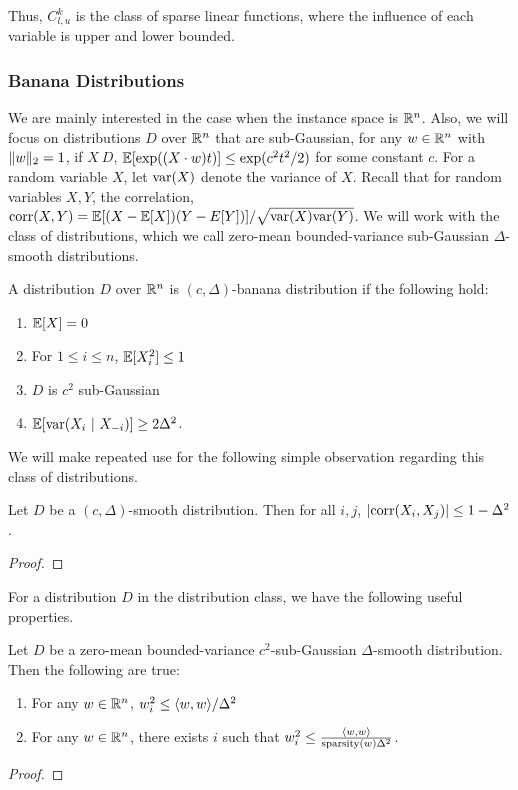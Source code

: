 Thus, $C^k_{l, u}$ is the class of sparse linear functions, where the influence
of each variable is upper and lower bounded.

\subsubsection{Banana Distributions}

We are mainly interested in the case when the instance space is $\mathbb{R}^n$.
Also, we will focus on distributions $D$ over $\mathbb{R}^n$ that are sub-Gaussian,
\ie for any $w \in \mathbb{R}^n$ with ${\Vert w \Vert_{2}} = 1$, if $X ~ D$, $\mathbb{E}[\exp((X
\cdot w) t)] \leq \exp(c^2t^2/2)$ for some constant $c$.  For a random variable
$X$, let $\mathrm{var}(X)$ denote the variance of $X$. Recall that for random variables
$X, Y$, the correlation, $\mathrm{corr}(X, Y) = \mathbb{E}[(X - \mathbb{E}[X]) (Y - E[Y])]/\sqrt{\mathrm{var}(X)
\mathrm{var}(Y)}$. We will work with the class of distributions, which we call zero-mean
bounded-variance sub-Gaussian $\Delta$-smooth distributions.


\begin{definition} A distribution $D$ over $\mathbb{R}^n$ is $(c, \Delta)$-banana
distribution if the following hold:
\begin{enumerate}
\item $\mathbb{E}[X] = 0$
\item For $1 \leq i \leq n$, $\mathbb{E}[X_i^2] \leq 1$
\item $D$ is $c^2$ sub-Gaussian
\item $\mathbb{E}[\mathrm{var}(X_i ~|~ X_{-i})] \geq 2 \Delta^2$.
\end{enumerate}
\end{definition}

We will make repeated use for the following simple observation regarding this
class of distributions.

\begin{lemma} Let $D$ be a $(c, \Delta)$-smooth distribution. Then for all $i, j$,
$|\mathrm{corr}(X_i, X_j)| \leq 1 - \Delta^2$.
\end{lemma}
\begin{proof}

\end{proof}

For a distribution $D$ in the distribution class, we have the following useful
properties. 
\begin{lemma} Let $D$ be a zero-mean bounded-variance $c^2$-sub-Gaussian
$\Delta$-smooth distribution. Then the following are true:
\begin{enumerate}
\item For any $w \in \mathbb{R}^n$, $w^2_i \leq \langle w, w \rangle/\Delta^2$
\item For any $w \in \mathbb{R}^n$, there exists $i$ such that $w^2_i \leq
\frac{\langle w, w \rangle}{\mathrm{sparsity}(w)\Delta^2}$.
\end{enumerate}
\end{lemma}
\begin{proof}

\end{proof}
